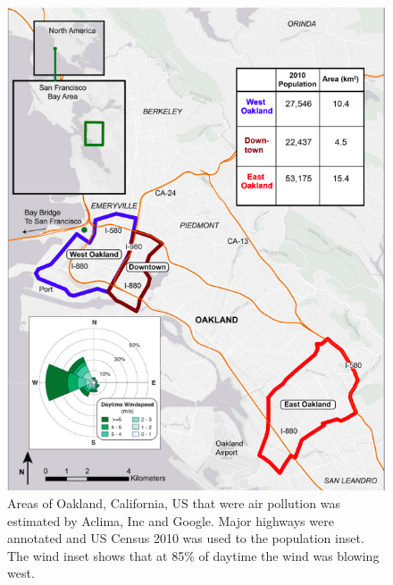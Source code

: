 \begin{figure}[t]
    \centering
    \includegraphics[width=\textwidth]{figures/3-dados-metodologia/pollution-map.png}
    \caption{Areas of Oakland, California, US that were air pollution was estimated by Aclima, Inc and Google. Major highways were annotated and US Census 2010 was used to the population inset. The wind inset shows that at 85\% of daytime the wind was blowing west.}
    \label{fig:3-pollution-map}
\end{figure}

